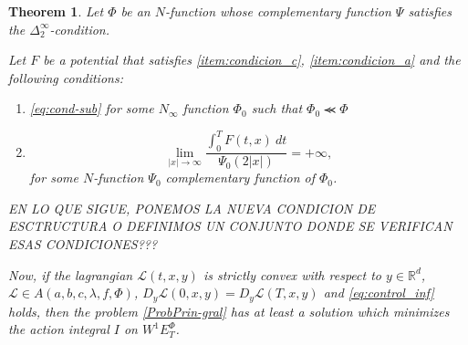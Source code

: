 \documentclass[twoside]{article}
\newtheorem{thm}{Theorem}[section]
\theoremstyle{remark}
\newcommand{\ephi}{E^{\Phi}}
\newcommand{\wphie}{W^{1}\ephi}
\newcommand{\rr}{\mathbb{R}}
\begin{document}
\begin{thm}\label{coercitividad-r}
Let $\Phi$ be an $N$-function whose complementary function $\Psi$ satisfies the $\Delta_2^{\infty}$-condition.

Let $F$ be a potential that satisfies \ref{item:condicion_c}, \ref{item:condicion_a} and the following conditions:
\begin{enumerate}
\item \eqref{eq:cond-sub} for some $N_{\infty}$ function $\Phi_0$ such that $\Phi_0\llcurly \Phi$
\item
\begin{equation}\label{eq:propiedad-coercividad-phi0}
\lim_{|x|\to\infty}\frac{\int_{0}^{T}F(t,x)\ dt}{\Psi_0(2|x|)}=+\infty,
\end{equation}
for some $N$-function $\Psi_0$ complementary function of $\Phi_0$.
\end{enumerate}

EN LO QUE SIGUE, PONEMOS LA NUEVA CONDICION DE ESCTRUCTURA O DEFINIMOS UN CONJUNTO DONDE SE VERIFICAN
ESAS CONDICIONES???

Now,  if the lagrangian $\mathcal{L}(t,x,y)$ is strictly convex  with respect to $y\in\rr^d$,
$\mathcal{L}\in {A}(a,b,c,\lambda,f,\Phi)$,
$D_y\mathcal{L}(0,x,y)=D_y\mathcal{L}(T,x,y)$
and \eqref{eq:control_inf} holds,
then the problem \eqref{ProbPrin-gral} has at least a solution which minimizes the action integral $I$ on $\wphie_T$.
\end{thm}
\end{document}
